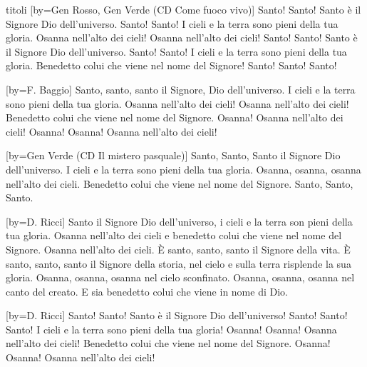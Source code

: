 \begin{songs}{titoli}
[by={Gen Rosso, Gen Verde (CD Come fuoco vivo)}]
\beginverse*
Santo! Santo! Santo è il Signore Dio dell'universo.
Santo! Santo! I cieli e la terra sono pieni della tua gloria.
\endverse
\beginchorus
Osanna nell'alto dei cieli! Osanna nell'alto dei cieli!
\endchorus
\beginverse*
Santo! Santo! Santo è il Signore Dio dell'universo.
Santo! Santo! I cieli e la terra sono pieni della tua gloria.
Benedetto colui che viene nel nome del Signore!
\endverse
\beginverse*
Santo! Santo! Santo!
\endverse
\endsong

[by={F. Baggio}]
\beginverse*
Santo, santo, santo il Signore,
Dio dell'universo.
I cieli e la terra sono pieni
della tua gloria.
\endverse
\beginchorus
Osanna nell'alto dei cieli!
Osanna nell'alto dei cieli!
\endchorus
\beginverse*
Benedetto colui che viene
nel nome del Signore.
Osanna! Osanna nell'alto dei cieli! 
Osanna! Osanna! Osanna nell'alto dei cieli!
\endverse
\endsong

[by={Gen Verde (CD Il mistero pasquale)}]
\beginverse*
Santo, Santo, Santo il Signore Dio dell'universo.
I cieli e la terra sono pieni della tua gloria.
\endverse
\beginchorus
Osanna, osanna, osanna nell'alto dei cieli. 
\endchorus
\beginverse*
Benedetto colui che viene nel nome del Signore.
\endverse
\beginverse*
Santo, Santo, Santo.
\endverse
\endsong

[by={D. Ricci}]
\beginverse*
Santo il Signore Dio dell'universo,
i cieli e la terra son pieni della tua gloria.
Osanna nell'alto dei cieli e benedetto colui che viene
nel nome del Signore. Osanna nell'alto dei cieli.
\endverse
\beginverse*
È santo, santo, santo il Signore della vita.
È santo, santo, santo il Signore della storia,
nel cielo e sulla terra risplende la sua gloria.
Osanna, osanna, osanna nel cielo sconfinato.
Osanna, osanna, osanna nel canto del creato.
E sia benedetto colui che viene in nome di Dio. 
\endverse
\endsong

[by={D. Ricci}]
\beginverse*
Santo! Santo! Santo
è il Signore Dio dell'universo!
Santo! Santo! Santo!
I cieli e la terra sono pieni della tua gloria!
Osanna! Osanna! Osanna nell'alto dei cieli!
Benedetto colui che viene nel nome del Signore.
Osanna! Osanna! Osanna nell'alto dei cieli! 
\endverse
\endsong


\end{songs}
